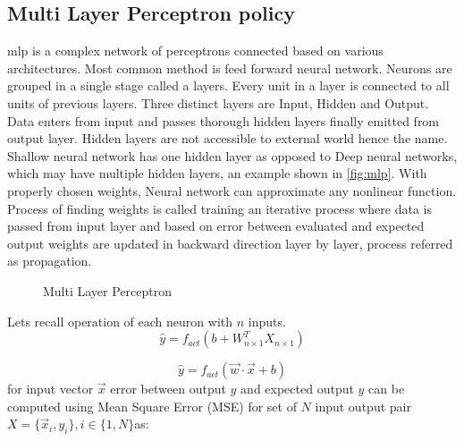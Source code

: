 \subsection{Multi Layer Perceptron policy}
\acrlong{mlp} is a complex network of perceptrons connected based on various architectures. Most common method is feed forward neural network. Neurons are grouped in a single stage called a layers. Every unit in a layer is connected to all units of previous layers. Three distinct layers are Input, Hidden and Output. Data enters from input and passes thorough hidden layers finally emitted from output layer. Hidden layers are not accessible to external world hence the name. Shallow neural network has one hidden layer as opposed to Deep neural networks, which may have multiple hidden layers, an example shown in \autoref{fig:mlp}. With properly chosen weights, Neural network can approximate any nonlinear function. Process of finding weights is called training an iterative process where data is passed from input layer and based on error between evaluated and expected output weights are updated in backward direction layer by layer, process referred as propagation.
\begin{figure}
    \centering
    \scalebox{0.65}{}
    \caption{Multi Layer Perceptron}
    \label{fig:mlp}
\end{figure}
Lets recall operation of each neuron with $n$ inputs. 
\begin{equation}
    \hat{y}=f_{act}(b+W_{n\times1}^TX_{n\times1})
\end{equation}

\begin{equation*}
\hat{y} =f_{act}(\vec{w} \cdotp \vec{x} +b)
\end{equation*}
for input vector $\displaystyle \vec{x}$ error between output $\displaystyle \hat{y}$ and expected output $\displaystyle y$ can be computed using Mean Square Error (MSE) for set of $\displaystyle N$ input output pair $\displaystyle X=\{\vec{x}_{i} ,y_{i}\} ,i\in \{1,N\}$as:

